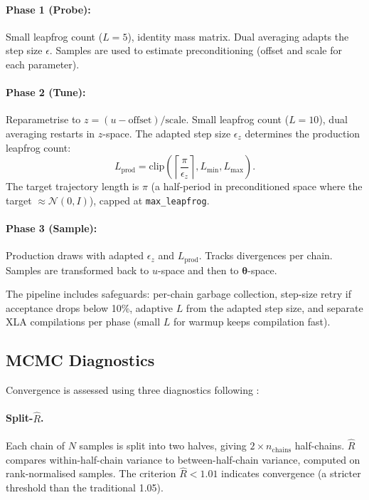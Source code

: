 \documentclass[11pt,a4paper]{article}
\theoremstyle{definition}
\newcommand{\btheta}{\boldsymbol{\theta}}
\newcommand{\code}[1]{\texttt{\color{codecolor}#1}}
\begin{document}
	\paragraph{Phase 1 (Probe):} Small leapfrog count ($L = 5$), identity mass matrix.
	Dual averaging adapts the step size $\epsilon$.
	Samples are used to estimate preconditioning (offset and scale for each parameter).
	
	\paragraph{Phase 2 (Tune):} Reparametrise to $z = (u - \mathrm{offset})/\mathrm{scale}$.
	Small leapfrog count ($L = 10$), dual averaging restarts in $z$-space.
	The adapted step size $\epsilon_z$ determines the production leapfrog count:
	\begin{equation}
		L_{\mathrm{prod}} = \mathrm{clip}\!\left(\left\lceil\frac{\pi}{\epsilon_z}\right\rceil, L_{\min}, L_{\max}\right).
	\end{equation}
	The target trajectory length is $\pi$ (a half-period in preconditioned space where the target $\approx \mathcal{N}(0, I)$), capped at \code{max\_leapfrog}.
	
	\paragraph{Phase 3 (Sample):} Production draws with adapted $\epsilon_z$ and $L_{\mathrm{prod}}$.
	Tracks divergences per chain.
	Samples are transformed back to $u$-space and then to $\btheta$-space.
	
	The pipeline includes safeguards: per-chain garbage collection, step-size retry if acceptance drops below 10\%, adaptive $L$ from the adapted step size, and separate XLA compilations per phase (small $L$ for warmup keeps compilation fast).
	
	\subsection{MCMC Diagnostics}
	\label{sec:diagnostics}
	
	Convergence is assessed using three diagnostics following \citet{vehtari2021rank}:
	
	\paragraph{Split-$\hat{R}$.}
	Each chain of $N$ samples is split into two halves, giving $2 \times n_{\mathrm{chains}}$ half-chains.
	$\hat{R}$ compares within-half-chain variance to between-half-chain variance, computed on rank-normalised samples.
	The criterion $\hat{R} < 1.01$ indicates convergence (a stricter threshold than the traditional 1.05).
	
\end{document}
